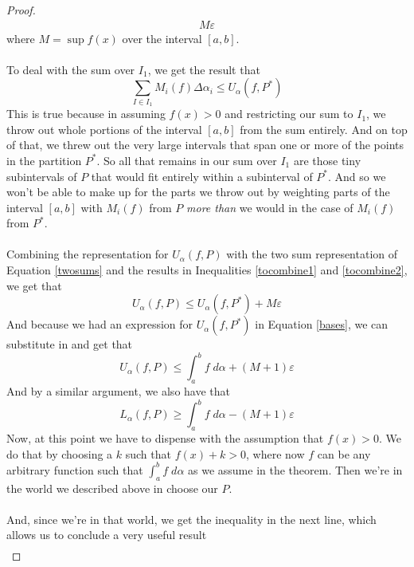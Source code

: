 \documentclass[12pt]{article}
\numberwithin{equation}{section} %
\theoremstyle{plain}
\theoremstyle{definition}
\theoremstyle{remark}
\begin{document}
\begin{proof}
\begin{align}
            M\varepsilon
        \label{tocombine1}
\end{align}
where $M = \sup f(x)$ over the interval $[a,b]$.
\\
\\
To deal with the sum over $I_1$, we get the result that
\begin{equation}
    \label{tocombine2}
    \sum_{I\in I_1} M_i(f) \Delta\alpha_i  \leq U_\alpha(f,P^*)
\end{equation}
This is true because in assuming $f(x)>0$ and restricting our sum to
$I_1$, we throw out whole portions of the interval $[a,b]$ from the sum
entirely. And on top of that, we threw out the very large intervals that
span one or more of the points in the partition $P^*$.  So all that
remains in our sum over $I_1$ are those tiny subintervals of $P$ that
would fit entirely within a subinterval of $P^*$. And so we won't be
able to make up for the parts we throw out by weighting parts of the
interval $[a,b]$ with $M_i(f)$ from $P$ \emph{more than} we would in the
case of $M_i(f)$ from $P^*$.
\\
\\
Combining the representation for $U_\alpha(f,P)$ with the two sum
representation of Equation \ref{twosums} and the results in Inequalities
\ref{tocombine1} and \ref{tocombine2}, we get that
\begin{equation}
    U_\alpha(f,P) \leq U_\alpha(f,P^*) + M\varepsilon
\end{equation}
And because we had an expression for $U_\alpha(f,P^*)$ in Equation
\ref{bases}, we can substitute in and get that
\begin{equation}
    \label{ass1}
    U_\alpha(f,P) \leq \int^b_a f\;d\alpha  + (M+1)\varepsilon
\end{equation}
And by a similar argument, we also have that
\begin{equation}
    \label{ass2}
    L_\alpha(f,P) \geq \int^b_a f\;d\alpha  - (M+1)\varepsilon
\end{equation}
Now, at this point we have to dispense with the assumption that
$f(x)>0$.  We do that by choosing a $k$ such that $f(x) + k >0$, where
now $f$ can be any arbitrary function such that $\int^b_a f\;d\alpha$ as
we assume in the theorem.  Then we're in the world we described above in
choose our $P$.
\\
\\
And, since we're in that world, we get the inequality in the next line,
which allows us to conclude a very useful result
\begin{align*}

\end{align*}
\end{proof}
\end{document}

